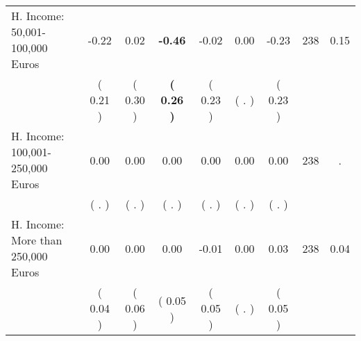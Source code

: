\begin{tabular}{lcccccccc}
H. Income: 50,001-100,000 Euros &     -0.22 &      0.02 & \textbf{    -0.46} &     -0.02 &      0.00 &     -0.23 & 238 &       0.15 \\ 
 & (     0.21 ) & (     0.30 ) & \textbf{(     0.26 )} & (     0.23 ) & (        . ) & (     0.23 ) & \\
H. Income: 100,001-250,000 Euros &      0.00 &      0.00 &      0.00 &      0.00 &      0.00 &      0.00 & 238 &          . \\ 
 & (        . ) & (        . ) & (        . ) & (        . ) & (        . ) & (        . ) & \\
H. Income: More than 250,000 Euros &      0.00 &      0.00 &      0.00 &     -0.01 &      0.00 &      0.03 & 238 &       0.04 \\ 
 & (     0.04 ) & (     0.06 ) & (     0.05 ) & (     0.05 ) & (        . ) & (     0.05 ) & \\
\bottomrule
\end{tabular}
